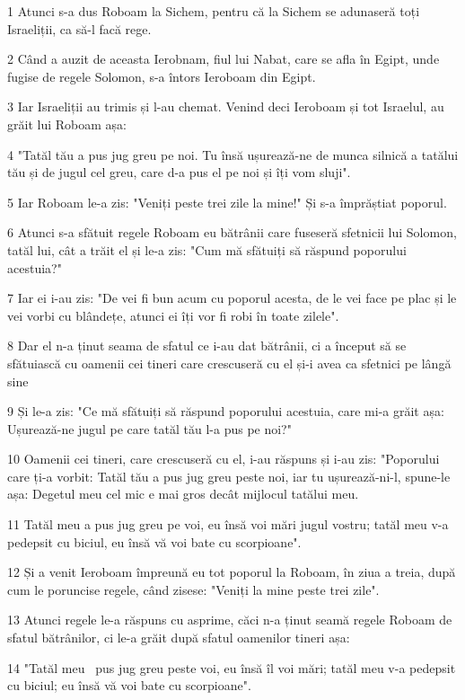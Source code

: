 \par 1 Atunci s-a dus Roboam la Sichem, pentru că la Sichem se adunaseră toți Israeliții, ca să-l facă rege.
\par 2 Când a auzit de aceasta Ierobnam, fiul lui Nabat, care se afla în Egipt, unde fugise de regele Solomon, s-a întors Ieroboam din Egipt.
\par 3 Iar Israeliții au trimis și l-au chemat. Venind deci Ieroboam și tot Israelul, au grăit lui Roboam așa:
\par 4 "Tatăl tău a pus jug greu pe noi. Tu însă ușurează-ne de munca silnică a tatălui tău și de jugul cel greu, care d-a pus el pe noi și îți vom sluji".
\par 5 Iar Roboam le-a zis: "Veniți peste trei zile la mine!" Și s-a împrăștiat poporul.
\par 6 Atunci s-a sfătuit regele Roboam eu bătrânii care fuseseră sfetnicii lui Solomon, tatăl lui, cât a trăit el și le-a zis: "Cum mă sfătuiți să răspund poporului acestuia?"
\par 7 Iar ei i-au zis: "De vei fi bun acum cu poporul acesta, de le vei face pe plac și le vei vorbi cu blândețe, atunci ei îți vor fi robi în toate zilele".
\par 8 Dar el n-a ținut seama de sfatul ce i-au dat bătrânii, ci a început să se sfătuiască cu oamenii cei tineri care crescuseră cu el și-i avea ca sfetnici pe lângă sine
\par 9 Și le-a zis: "Ce mă sfătuiți să răspund poporului acestuia, care mi-a grăit așa: Ușurează-ne jugul pe care tatăl tău l-a pus pe noi?"
\par 10 Oamenii cei tineri, care crescuseră cu el, i-au răspuns și i-au zis: "Poporului care ți-a vorbit: Tatăl tău a pus jug greu peste noi, iar tu ușurează-ni-l, spune-le așa: Degetul meu cel mic e mai gros decât mijlocul tatălui meu.
\par 11 Tatăl meu a pus jug greu pe voi, eu însă voi mări jugul vostru; tatăl meu v-a pedepsit cu biciul, eu însă vă voi bate cu scorpioane".
\par 12 Și a venit Ieroboam împreună eu tot poporul la Roboam, în ziua a treia, după cum le poruncise regele, când zisese: "Veniți la mine peste trei zile".
\par 13 Atunci regele le-a răspuns cu asprime, căci n-a ținut seamă regele Roboam de sfatul bătrânilor, ci le-a grăit după sfatul oamenilor tineri așa:
\par 14 "Tatăl meu  pus jug greu peste voi, eu însă îl voi mări; tatăl meu v-a pedepsit cu biciul; eu însă vă voi bate cu scorpioane".
